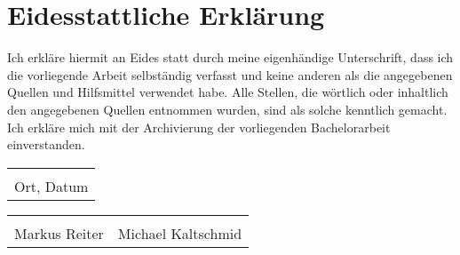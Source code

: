 \section*{Eidesstattliche Erklärung}

Ich erkläre hiermit an Eides statt durch meine eigenhändige Unterschrift, dass ich die vorliegende
Arbeit selbständig verfasst und keine anderen als die angegebenen Quellen und Hilfsmittel
verwendet habe. Alle Stellen, die wörtlich oder inhaltlich den angegebenen Quellen entnommen wurden,
sind als solche kenntlich gemacht. Ich erkläre mich mit der Archivierung der vorliegenden
Bachelorarbeit einverstanden.

\vspace{2.5cm}

\begin{tabular}{@{}>{\centering}p{2.75in}@{}}
\dotfill   \tabularnewline
Ort, Datum \tabularnewline
\end{tabular}

\vspace{2cm}

\begin{tabular}{@{}>{\centering}p{2.75in}>{\centering}p{2.75in}@{}}
\dotfill      & \dotfill           \tabularnewline
Markus Reiter & Michael Kaltschmid \tabularnewline
\end{tabular}
